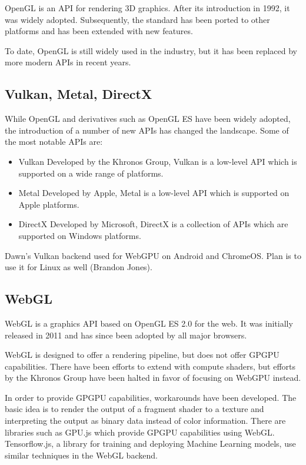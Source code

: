 OpenGL is an API for rendering 3D graphics. After its introduction in 1992, it was widely adopted. Subsequently, the standard has been ported to other platforms and has been extended with new features.

To date, OpenGL is still widely used in the industry, but it has been replaced by more modern APIs in recent years.

\subsection{Vulkan, Metal, DirectX}

While OpenGL and derivatives such as OpenGL ES have been widely adopted, the introduction of a number of new APIs has changed the landscape. Some of the most notable APIs are:

\begin{itemize}
    \item{Vulkan} Developed by the Khronos Group, Vulkan is a low-level API which is supported on a wide range of platforms.
    \item{Metal} Developed by Apple, Metal is a low-level API which is supported on Apple platforms.
    \item{DirectX} Developed by Microsoft, DirectX is a collection of APIs which are supported on Windows platforms.
\end{itemize}

Dawn's Vulkan backend used for WebGPU on Android and ChromeOS. Plan is to use it for Linux as well (Brandon Jones).

\subsection{WebGL}

WebGL is a graphics API based on OpenGL ES 2.0 for the web. It was initially released in 2011 and has since been adopted by all major browsers.

WebGL is designed to offer a rendering pipeline, but does not offer GPGPU capabilities. There have been efforts to extend with compute shaders, but efforts by the Khronos Group have been halted in favor of focusing on WebGPU instead.

In order to provide GPGPU capabilities, workarounds have been developed. The basic idea is to render the output of a fragment shader to a texture and interpreting the output as binary data instead of color information.
There are libraries such as GPU.js which provide GPGPU capabilities using WebGL. Tensorflow.js, a library for training and deploying Machine Learning models, use similar techniques in the WebGL backend.

